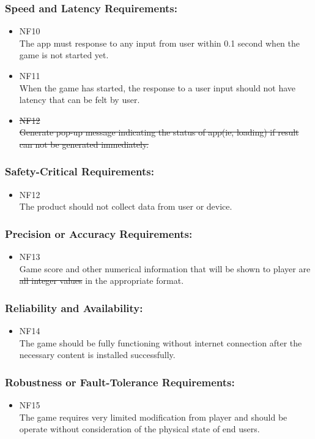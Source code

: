 \documentclass[12pt, titlepage]{article}
\begin{document}
\subsubsection{Speed and Latency Requirements:}
\begin{itemize}
    \item NF{\color{red}10}\\
    The app must response to any input from user within 0.1 second when the game is not started yet.
	\item NF{\color{red}11}\\
	When the game has started, the response to a user input should not have latency that can be felt by user.
	\item \sout{NF12}\\
	\sout{Generate pop-up message indicating the status of app(ie, loading) if result can not be generated immediately.}
\end{itemize}
\subsubsection{Safety-Critical Requirements:}
\begin{itemize}
    \item NF{\color{red}12}\\
    The product should not collect data from user or device.
\end{itemize}
\subsubsection{Precision or Accuracy Requirements:}
\begin{itemize}
    \item NF{\color{red}13}\\
    Game score and other numerical information that will be shown to player are \sout{all integer values} {\color{red} in the appropriate format}.
\end{itemize}
\subsubsection{Reliability and Availability:}
\begin{itemize}
    \item NF{\color{red}14}\\
    The game should be fully functioning without internet connection after the necessary content is installed successfully.
\end{itemize}
\subsubsection{Robustness or Fault-Tolerance Requirements:}
\begin{itemize}
    \item NF{\color{red}15}\\
    The game requires very limited modification from player and should be operate without consideration of the physical state of end users.
\end{itemize}
\end{document}
